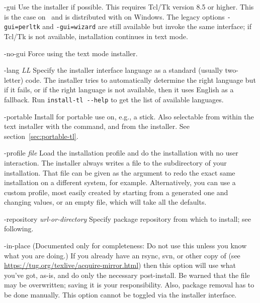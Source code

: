\documentclass{article}
\begin{document}
\begin{ttdescription}
\item[-gui] Use the \GUI{} installer if possible. This requires
  Tcl/Tk version 8.5 or higher. This is the case on \MacOSX\ and is
  distributed with \TL{} on Windows. The legacy options
  \texttt{-gui=perltk} and \texttt{-gui=wizard} are still available
  but invoke the same \GUI{} interface; if Tcl/Tk is not available,
  installation continues in text mode.

\item[-no-gui] Force using the text mode installer.

\item[-lang {\sl LL}] Specify the installer interface
  language as a standard (usually two-letter) code.  The installer tries
  to automatically determine the right language but if it fails, or if
  the right language is not available, then it uses English as a
  fallback.  Run \verb|install-tl --help| to get the list of available
  languages.

\item[-portable] Install for portable use on, e.g., a \USB{} stick.
  Also selectable from within the text installer with the 
  command, and from the \GUI{} installer.  See
  section~\ref{sec:portable-tl}.

\item[-profile {\sl file}] Load the installation profile  and
  do the installation with no user interaction.  The installer always
  writes a file  to the 
  subdirectory of your installation.  That file can be given as the
  argument to redo the exact same installation on a different system,
  for example.  Alternatively, you can use a custom profile, most easily
  created by starting from a generated one and changing values, or an
  empty file, which will take all the defaults.

\item [-repository {\sl url-or-directory}] Specify package
  repository from which to install; see following.

\item[-in-place] (Documented only for completeness: Do not use this
  unless you know what you are doing.) If you already have an rsync, svn,
  or other copy of \TL{} (see
  \url{https://tug.org/texlive/acquire-mirror.html}) then this option
  will use what you've got, as-is, and do only the necessary
  post-install.  Be warned that the file 
  may be overwritten; saving it is your responsibility.  Also, package
  removal has to be done manually. This option cannot be toggled via the
  installer interface.
\end{ttdescription}
\end{document}
